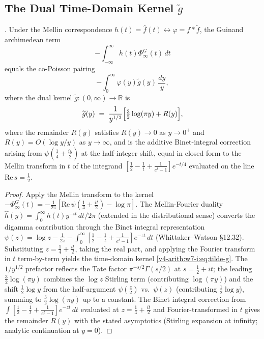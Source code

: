 \subsection{The Dual Time-Domain Kernel \(\widetilde g\)}
\label{v4-arith:w7-i:burnol:dual-kernel}

\begin{proposition}
\label{v4-arith:w7-i:prop:dual-kernel}
\ClaimStatusProvedHere. Under the Mellin correspondence
\(h(t)=\widehat{f}(t)\leftrightarrow\varphi=f\ast\widetilde f\), the
Guinand archimedean term
\begin{equation}
\label{v4-arith:w7-i:eq:guinand-arch-recall}
-\int_{-\infty}^{\infty}h(t)\Phi_{\infty}^{G}(t)\,dt
\end{equation}
equals the co-Poisson pairing
\begin{equation}
\label{v4-arith:w7-i:eq:dual-kernel}
-\int_{0}^{\infty}\varphi(y)\widetilde g(y)\,\frac{dy}{y},
\end{equation}
where the dual kernel \(\widetilde g\colon(0,\infty)\to\mathbb{R}\) is
\begin{equation}
\label{v4-arith:w7-i:eq:tilde-g}
\widetilde g(y)\;=\;\frac{1}{y^{1/2}}\Bigl[\tfrac{3}{2}\log(\pi y)+R(y)\Bigr],
\end{equation}
where the remainder \(R(y)\) satisfies \(R(y)\to 0\) as \(y\to 0^{+}\)
and \(R(y)=O(\log y/y)\) as \(y\to\infty\), and is the additive
Binet-integral correction arising from
\(\psi(\tfrac14+\tfrac{iy}{2})\)
at the half-integer shift, equal in closed form to the Mellin
transform in \(t\) of the integrand
\([\tfrac{1}{2}-\tfrac{1}{t}+\tfrac{1}{e^{t}-1}]e^{-t/4}\) evaluated
on the line \(\mathrm{Re}\,s=\tfrac{1}{2}\).
\end{proposition}

\begin{proof}
Apply the Mellin transform to the kernel
\(-\Phi_{\infty}^{G}(t)=-\tfrac{1}{2\pi}[\mathrm{Re}\,\psi(\tfrac14+\tfrac{it}{2})-\log\pi]\).
The Mellin-Fourier duality
\(\widehat{h}(y)=\int_{0}^{\infty}h(t)y^{-it}\,dt/2\pi\)
(extended in the distributional sense) converts the digamma
contribution through the Binet integral representation
\(\psi(z)=\log z-\tfrac{1}{2z}-\int_{0}^{\infty}[\tfrac{1}{2}-\tfrac{1}{t}+\tfrac{1}{e^{t}-1}]e^{-zt}\,dt\)
(Whittaker--Watson \S12.32). Substituting \(z=\tfrac14+\tfrac{it}{2}\),
taking the real part, and applying the Fourier transform in \(t\) term-by-term yields the time-domain kernel \eqref{v4-arith:w7-i:eq:tilde-g}.
The \(1/y^{1/2}\) prefactor reflects the Tate factor
\(\pi^{-s/2}\Gamma(s/2)\) at \(s=\tfrac12+it\); the leading
\(\tfrac{3}{2}\log(\pi y)\) combines the \(\log z\) Stirling term
(contributing \(\log(\pi y)\)) and the shift \(\tfrac12\log y\) from
the half-argument \(\psi(\tfrac{z}{2})\) vs.~\(\psi(z)\) (contributing
\(\tfrac12\log y\)), summing to \(\tfrac32\log(\pi y)\) up to a constant.
The Binet integral correction from
\(\int[\tfrac12-\tfrac{1}{t}+\tfrac{1}{e^{t}-1}]e^{-zt}\,dt\)
evaluated at \(z=\tfrac14+\tfrac{it}{2}\) and Fourier-transformed in
\(t\) gives the remainder \(R(y)\) with the stated asymptotics
(Stirling expansion at infinity; analytic continuation at \(y=0\)).
\end{proof}

